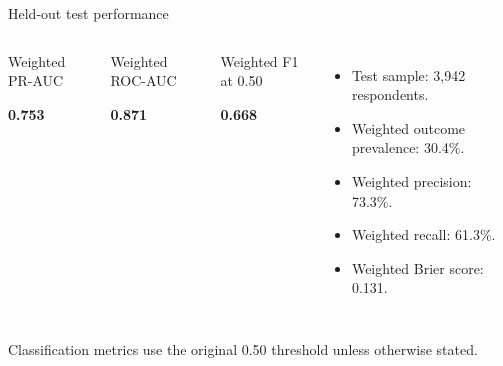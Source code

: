 \documentclass[aspectratio=169,10pt]{beamer}
\begin{document}
\begin{frame}{Held-out test performance}

\begin{columns}[T,onlytextwidth]


\begin{block}{Weighted PR-AUC}

\centering

{\LARGE\bfseries\color{StrathBlue}0.753}

\end{block}

\begin{block}{Weighted ROC-AUC}

\centering

{\LARGE\bfseries\color{StrathBlue}0.871}

\end{block}

\begin{block}{Weighted F1 at 0.50}

\centering

{\LARGE\bfseries\color{StrathBlue}0.668}

\end{block}


\begin{itemize}

    \item Test sample: 3,942 respondents.

    \item Weighted outcome prevalence: 30.4\%.

    \item Weighted precision: 73.3\%.

    \item Weighted recall: 61.3\%.

    \item Weighted Brier score: 0.131.

\end{itemize}

\end{columns}

\vspace{.1cm}

{\footnotesize\color{Muted}
Classification metrics use the original 0.50 threshold unless otherwise stated.
}

\end{frame}
\end{document}
